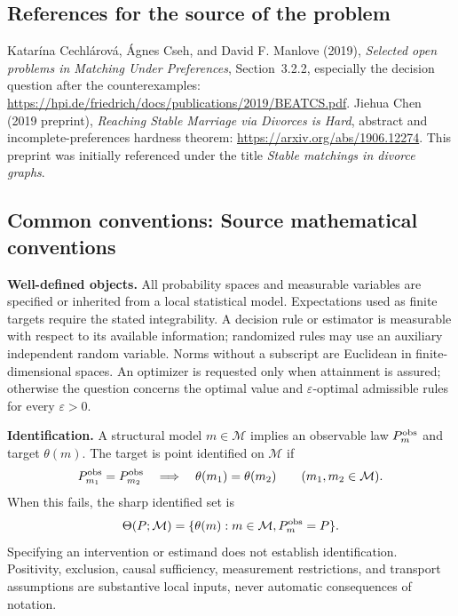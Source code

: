\documentclass[11pt,a4paper]{article}
\begin{document}
\subsection*{References for the source of the problem}
Katar\'ina Cechl\'arov\'a, \'Agnes Cseh, and David F. Manlove (2019), \emph{Selected open problems in Matching Under Preferences}, Section~3.2.2, especially the decision question after the counterexamples: \url{https://hpi.de/friedrich/docs/publications/2019/BEATCS.pdf}. Jiehua Chen (2019 preprint), \emph{Reaching Stable Marriage via Divorces is Hard}, abstract and incomplete-preferences hardness theorem: \url{https://arxiv.org/abs/1906.12274}. This preprint was initially referenced under the title \emph{Stable matchings in divorce graphs}.

\subsection*{Common conventions: Source mathematical conventions}

\textbf{Well-defined objects.}
All probability spaces and measurable variables are specified or inherited
from a local statistical model. Expectations used as finite targets require
the stated integrability. A decision rule or estimator is measurable with
respect to its available information; randomized rules may use an auxiliary
independent random variable. Norms without a subscript are Euclidean in
finite-dimensional spaces. An optimizer is requested only when attainment
is assured; otherwise the question concerns the optimal value and
$\varepsilon$-optimal admissible rules for every $\varepsilon>0$.

\textbf{Identification.}
A structural model $m\in\mathcal M$ implies an observable law
$P_m^{\rm obs}$ and target $\theta(m)$. The target is point identified on
$\mathcal M$ if
\[
 P_{m_1}^{\rm obs}=P_{m_2}^{\rm obs}
 \quad\Longrightarrow\quad\theta(m_1)=\theta(m_2)
 \qquad(m_1,m_2\in\mathcal M).
\]
When this fails, the sharp identified set is
\[
 \Theta(P;\mathcal M)=\{\theta(m):m\in\mathcal M,
                                  P_m^{\rm obs}=P\}.
\]
Specifying an intervention or estimand does not establish identification.
Positivity, exclusion, causal sufficiency, measurement restrictions, and
transport assumptions are substantive local inputs, never automatic
consequences of notation.
\end{document}
